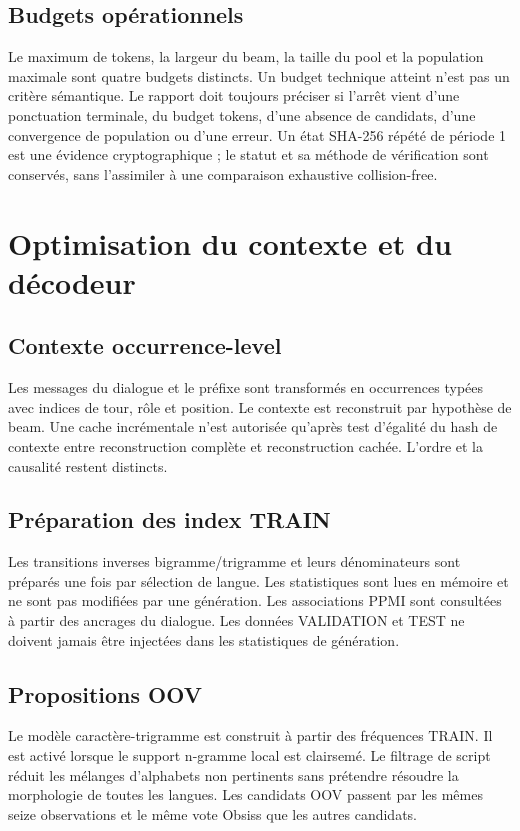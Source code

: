 \documentclass[11pt,a4paper]{report}
\begin{document}
\section{Budgets opérationnels}
Le maximum de tokens, la largeur du beam, la taille du pool et la population maximale sont quatre budgets distincts. Un budget technique atteint n'est pas un critère sémantique. Le rapport doit toujours préciser si l'arrêt vient d'une ponctuation terminale, du budget tokens, d'une absence de candidats, d'une convergence de population ou d'une erreur. Un état SHA-256 répété de période 1 est une évidence cryptographique ; le statut et sa méthode de vérification sont conservés, sans l'assimiler à une comparaison exhaustive collision-free.

\chapter{Optimisation du contexte et du décodeur}
\section{Contexte occurrence-level}
Les messages du dialogue et le préfixe sont transformés en occurrences typées avec indices de tour, rôle et position. Le contexte est reconstruit par hypothèse de beam. Une cache incrémentale n'est autorisée qu'après test d'égalité du hash de contexte entre reconstruction complète et reconstruction cachée. L'ordre et la causalité restent distincts.

\section{Préparation des index TRAIN}
Les transitions inverses bigramme/trigramme et leurs dénominateurs sont préparés une fois par sélection de langue. Les statistiques sont lues en mémoire et ne sont pas modifiées par une génération. Les associations PPMI sont consultées à partir des ancrages du dialogue. Les données VALIDATION et TEST ne doivent jamais être injectées dans les statistiques de génération.

\section{Propositions OOV}
Le modèle caractère-trigramme est construit à partir des fréquences TRAIN. Il est activé lorsque le support n-gramme local est clairsemé. Le filtrage de script réduit les mélanges d'alphabets non pertinents sans prétendre résoudre la morphologie de toutes les langues. Les candidats OOV passent par les mêmes seize observations et le même vote Obsiss que les autres candidats.
\end{document}
